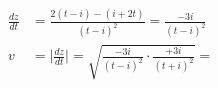 \documentclass[preview]{standalone}
\begin{document}
\begin{align*}
\frac{dz}{dt} &= \frac{2(t-i) - (i+2t)}{(t-i)^2} = \frac{-3i}{(t-i)^2} \\ v &= \Big|\frac{dz}{dt}\Big| = \sqrt{\frac{-3i}{(t-i)^2} \cdot \frac{+3i}{(t+i)^2}} =
\end{align*}
\end{document}
